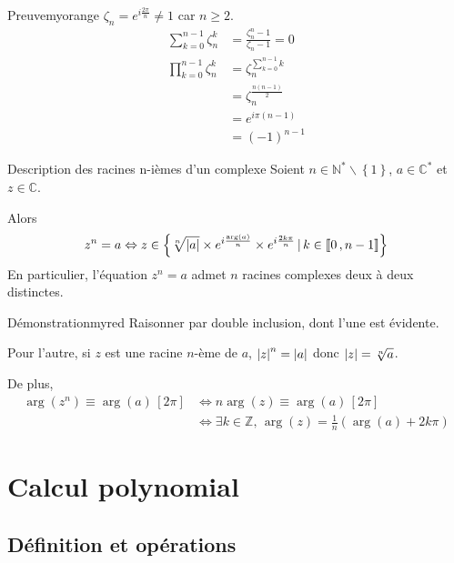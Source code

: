     \begin{demo}{Preuve}{myorange}
		$ \zeta_n = e^{i \frac{2\pi}{n}} \neq 1$ car $n \geq 2$.
	\begin{align*}
		\sum\limits_{k=0}^{n-1} \zeta_n^k &= \frac{\zeta_n^n -1}{\zeta_n -1} =0 \\
		\prod\limits_{k=0}^{n-1} \zeta_n^k &= \zeta_n^{\sum_{k=0}^{n-1} k} \\
		&=  \zeta_n^{\frac{n(n-1)}{2}} \\
		&= e^{i\pi (n-1)} \\
		&= (-1)^{n-1}
	\end{align*}
	\end{demo}

    \begin{theo}{Description des racines n-ièmes d’un complexe}{}
        Soient $n \in \mathbb{N}^* \backslash \left\{ 1\right\}$, $a \in \mathbb{C}^*$ et $z \in \mathbb{C}$.
    
        Alors \[ z^{n}=a \Leftrightarrow z \in \left\{\sqrt[n]{|a|} \times e^{i\frac{\arg(a)}{n}} \times e^{i\frac{2k\pi}{n}} \,|\, k \in \left\llbracket 0 \, , n-1 \right\rrbracket \right\} \]
        En particulier, l’équation $z^n = a$ admet $n$ racines complexes deux à deux distinctes.
    \end{theo}
    
    \begin{demo}{Démonstration}{myred}
        Raisonner par double inclusion, dont l’une est évidente.
        
        Pour l’autre, si $z$ est une racine $n$-ème de $a$, $\left\lvert z\right\rvert^n = \left\lvert a\right\rvert$ donc $\left\lvert z\right\rvert = \sqrt[n]{a}$. 
        
        De plus, \begin{align*}
            \arg(z^n) \equiv \arg(a) \, [2\pi] & \iff n\arg(z) \equiv \arg(a) \, [2 \pi] \\
            & \iff \exists k \in \mathbb{Z}, \, \arg(z) = \frac{1}{n} (\arg(a) + 2 k \pi)
        \end{align*}
    \end{demo}


\newpage

\section{Calcul polynomial}

\subsection{Définition et opérations}

